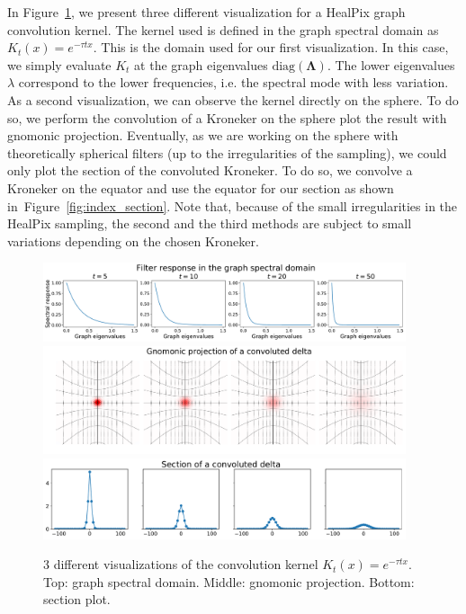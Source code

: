 \documentclass[final,twocolumn,3p,times,authoryear]{elsarticle}
\newcommand{\figref}[1]{Figure~\ref{fig:#1}}
\renewcommand{\b}[1]{{\bm{#1}}}   %
\newcommand{\1}{\b{1}}              %
\newcommand{\0}{\b{0}}              %
\newcommand{\bLambda}{\b{\Lambda}}
\begin{document}
In \figref{gaussian_filters_visualization}, we present three different
visualization for a HealPix graph convolution kernel. The kernel used is defined in the graph spectral domain as $K_t(x)=e^{-\tau t x}$. This is the domain used for our first visualization. In this case, we simply evaluate $K_t$
at the graph eigenvalues $\text{diag}(\bLambda)$. The lower eigenvalues $\lambda$ correspond to the lower frequencies, i.e. the spectral mode with less variation.
As a second visualization, we can observe the kernel directly on the sphere. To do so, we perform the convolution of a
Kroneker on the sphere plot the result with gnomonic projection. Eventually, as we are
working on the sphere with theoretically spherical filters (up to the irregularities of the sampling), we could only plot the section of the convoluted Kroneker. To do so, we convolve a Kroneker on the equator and use the equator for our section as shown in~\figref{index_section}. Note that, because of the small irregularities in the HealPix
sampling, the second and the third methods are subject to small variations depending on the
chosen Kroneker.

\begin{figure}[!ht]
\centering
\includegraphics[width=0.95\textwidth]{figures/gaussian_filters_spectral.pdf}
\includegraphics[width=0.95\textwidth]{figures/gaussian_filters_gnomonic.pdf}
\includegraphics[width=0.95\textwidth]{figures/gaussian_filters_section.pdf}
\caption{3 different visualizations of the convolution kernel $K_t(x)=e^{-\tau t x}$.
Top: graph spectral domain.
Middle: gnomonic projection.
Bottom: section plot.}
\label{fig:gaussian_filters_visualization}
\end{figure}
\end{document}
